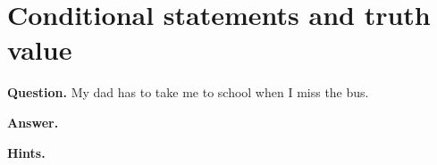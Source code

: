 \documentclass{article}
\begin{document}
\section*{Conditional statements and truth value}
\textbf{Question.} My dad has to take me to school when I miss the bus.

\textbf{Answer.} 

\textbf{Hints.}
\begin{itemize}

\end{itemize}
\end{document}
